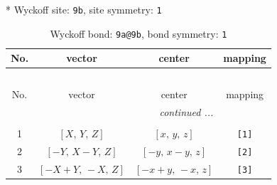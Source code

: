\documentclass[fleqn,8pt]{jsarticle}
\begin{document}
* Wyckoff site: {\tt 9b}, site symmetry: {\tt 1}
\renewcommand{\arraystretch}{1.2}
\begin{longtable}{cccc}
\caption{Wyckoff bond: {\tt 9a@9b}, bond symmetry: {\tt 1}}
 \\
 \hline \hline
No. & vector & center & mapping \\ \hline \endfirsthead

\multicolumn{3}{l}{\tablename\ \thetable{}} \\
 \hline \hline
No. & vector & center & mapping \\ \hline \endhead

 \hline \hline
\multicolumn{3}{r}{\footnotesize\it continued ...} \\ \endfoot

 \hline \hline
\multicolumn{3}{r}{} \\ \endlastfoot

1 & $\left[ X,\, Y,\, Z \right]$ & $\left[ x,\, y,\, z \right]$ & {\tt [1]} \\ \hline
2 & $\left[ - Y,\, X - Y,\, Z \right]$ & $\left[ - y,\, x - y,\, z \right]$ & {\tt [2]} \\ \hline
3 & $\left[ - X + Y,\, - X,\, Z \right]$ & $\left[ - x + y,\, - x,\, z \right]$ & {\tt [3]} \\
\end{longtable}
\end{document}
